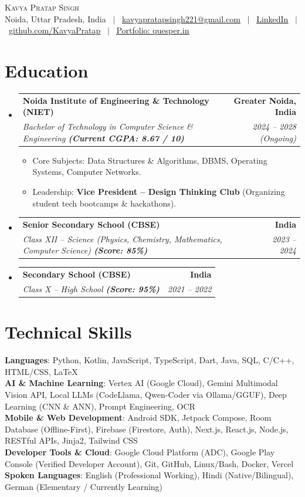 \documentclass[letterpaper,10pt]{article}
\makeatletter
\newcommand{\resumeItem}[1]{
  \item\small{
    {#1 \vspace{-2pt}}
  }
}
\newcommand{\resumeSubheading}[4]{
  \vspace{-2pt}\item
    \begin{tabular*}{0.98\textwidth}[t]{l@{\extracolsep{\fill}}r}
      \textbf{#1} & \textbf{\small #2} \\
      \textit{\small#3} & \textit{\small #4} \\
    \end{tabular*}\vspace{-5pt}
}
\newcommand{\resumeSubHeadingListStart}{\begin{itemize}[leftmargin=0.15in, label={}]}
\newcommand{\resumeSubHeadingListEnd}{\end{itemize}}
\newcommand{\resumeItemListStart}{\begin{itemize}[leftmargin=0.15in]}
\newcommand{\resumeItemListEnd}{\end{itemize}\vspace{-5pt}}
\makeatother
\begin{document}
\begin{center}
    {\Huge \scshape Kavya Pratap Singh} \\ \vspace{2pt}
    \small Noida, Uttar Pradesh, India \ $|$ \ 
    \href{mailto:kavyapratapsingh221@gmail.com}{\underline{kavyapratapsingh221@gmail.com}} \ $|$ \ 
    \href{https://linkedin.com/in/your-profile}{\underline{LinkedIn}} \ $|$ \ 
    \href{https://github.com/KavyaPratap}{\underline{github.com/KavyaPratap}} \ $|$ \ 
    \href{https://quesper.in}{\underline{Portfolio: quesper.in}}
\end{center}

\section{Education}
  \resumeSubHeadingListStart
    \resumeSubheading
      {Noida Institute of Engineering \& Technology (NIET)}{Greater Noida, India}
      {Bachelor of Technology in Computer Science \& Engineering \textbf{(Current CGPA: 8.67 / 10)}}{2024 -- 2028 (Ongoing)}
      \resumeItemListStart
        \resumeItem{Core Subjects: Data Structures \& Algorithms, DBMS, Operating Systems, Computer Networks.}
        \resumeItem{Leadership: \textbf{Vice President -- Design Thinking Club} (Organizing student tech bootcamps \& hackathons).}
      \resumeItemListEnd
    \resumeSubheading
      {Senior Secondary School (CBSE)}{India}
      {Class XII -- Science (Physics, Chemistry, Mathematics, Computer Science) \textbf{(Score: 85\%)}}{2023 -- 2024}
    \resumeSubheading
      {Secondary School (CBSE)}{India}
      {Class X -- High School \textbf{(Score: 95\%)}}{2021 -- 2022}
  \resumeSubHeadingListEnd

\section{Technical Skills}
 \begin{itemize}[leftmargin=0.15in, label={}]
    \small{\item{
     \textbf{Languages}{: Python, Kotlin, JavaScript, TypeScript, Dart, Java, SQL, C/C++, HTML/CSS, LaTeX} \\
     \textbf{AI \& Machine Learning}{: Vertex AI (Google Cloud), Gemini Multimodal Vision API, Local LLMs (CodeLlama, Qwen-Coder via Ollama/GGUF), Deep Learning (CNN \& ANN), Prompt Engineering, OCR} \\
     \textbf{Mobile \& Web Development}{: Android SDK, Jetpack Compose, Room Database (Offline-First), Firebase (Firestore, Auth), Next.js, React.js, Node.js, RESTful APIs, Jinja2, Tailwind CSS} \\
     \textbf{Developer Tools \& Cloud}{: Google Cloud Platform (ADC), Google Play Console (Verified Developer Account), Git, GitHub, Linux/Bash, Docker, Vercel} \\
     \textbf{Spoken Languages}{: English (Professional Working), Hindi (Native/Bilingual), German (Elementary / Currently Learning)}
    }}
 \end{itemize}
\end{document}
